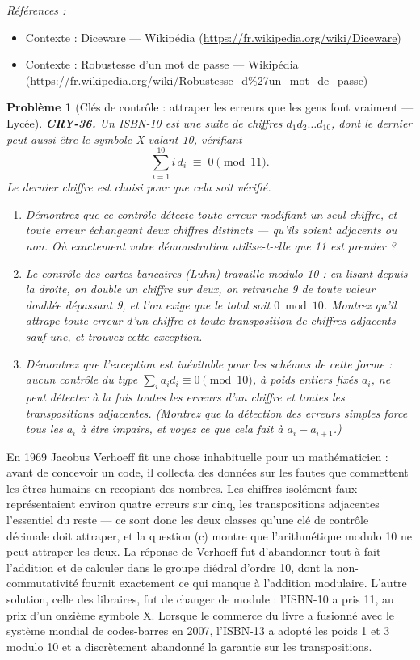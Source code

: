 \documentclass[11pt]{article}
\newtheorem{problem}{Problème}
\newenvironment{refs}{\par\small\noindent\emph{Références :}\begin{itemize}\setlength\itemsep{0pt}}{\end{itemize}\normalsize}
\begin{document}
\begin{refs}
\item Contexte : Diceware --- Wikipédia (\url{https://fr.wikipedia.org/wiki/Diceware})
\item Contexte : Robustesse d'un mot de passe --- Wikipédia (\url{https://fr.wikipedia.org/wiki/Robustesse_d%27un_mot_de_passe})
\end{refs}

\bigskip

\begin{problem}[{Clés de contrôle : attraper les erreurs que les gens font vraiment --- Lycée}]
\textbf{CRY-36.} Un ISBN-10 est une suite de chiffres $d_1 d_2 \dots d_{10}$, dont le
dernier peut aussi être le symbole X valant 10, vérifiant
\[ \sum_{i=1}^{10} i \, d_i \;\equiv\; 0 \pmod{11}. \]
Le dernier chiffre est choisi pour que cela soit vérifié.
\begin{enumerate}
\item[(a)] Démontrez que ce contrôle détecte toute erreur modifiant un seul chiffre, et toute erreur
échangeant deux chiffres distincts --- qu'ils soient adjacents ou non. Où exactement votre
démonstration utilise-t-elle que 11 est premier ?
\item[(b)] Le contrôle des cartes bancaires (Luhn) travaille modulo 10 : en lisant depuis la droite,
on double un chiffre sur deux, on retranche 9 de toute valeur doublée dépassant 9, et l'on
exige que le total soit $0 \bmod 10$. Montrez qu'il attrape toute erreur d'un chiffre et
toute transposition de chiffres \textit{adjacents} sauf une, et trouvez cette exception.
\item[(c)] Démontrez que l'exception est inévitable pour les schémas de cette forme : aucun contrôle
du type $\sum_i a_i d_i \equiv 0 \pmod{10}$, à poids entiers fixés $a_i$, ne peut
détecter à la fois toutes les erreurs d'un chiffre et toutes les transpositions adjacentes.
(Montrez que la détection des erreurs simples force tous les $a_i$ à être impairs, et voyez
ce que cela fait à $a_i - a_{i+1}$.)
\end{enumerate}

\end{problem}

\noindent En 1969 Jacobus Verhoeff fit une chose inhabituelle pour un mathématicien :
avant de concevoir un code, il collecta des données sur les fautes que commettent les êtres
humains en recopiant des nombres. Les chiffres isolément faux représentaient environ quatre
erreurs sur cinq, les transpositions adjacentes l'essentiel du reste --- ce sont donc les deux
classes qu'une clé de contrôle décimale doit attraper, et la question (c) montre que
l'arithmétique modulo 10 ne peut attraper les deux. La réponse de Verhoeff fut d'abandonner
tout à fait l'addition et de calculer dans le groupe diédral d'ordre 10, dont la
non-commutativité fournit exactement ce qui manque à l'addition modulaire. L'autre solution,
celle des libraires, fut de changer de module : l'ISBN-10 a pris 11, au prix d'un onzième
symbole X. Lorsque le commerce du livre a fusionné avec le système mondial de codes-barres en
2007, l'ISBN-13 a adopté les poids 1 et 3 modulo 10 et a discrètement abandonné la garantie
sur les transpositions.
\end{document}
